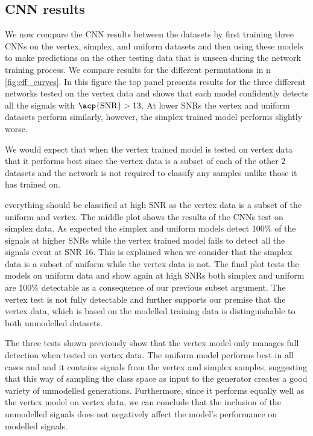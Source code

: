 \documentclass[12pt]{iopart}
\begin{document}
\subsection{CNN results}

We now compare the \ac{CNN} results between the datasets by first training three \acp{CNN} on the vertex, simplex, and uniform datasets and then using these models to make predictions on the other testing data that is unseen during the network training process. We compare results for the different permutations in n \cref{fig:eff_curves}. In this figure the top panel presents results for the three different networks tested on the vertex data and shows that each model confidently detects all the signals with $\text{\acp{SNR}} >13$. At lower \acp{SNR} the vertex and uniform datasets perform similarly, however, the simplex trained model performs slightly worse.

We would expect that when the vertex trained model is tested on vertex data that it performs best since the vertex data is a subset of each of the other 2 datasets and the network is not required to classify any samples unlike those it has trained on.

everything should be classified at high \ac{SNR} as the vertex data is a subset of the uniform and vertex. The middle plot shows the results of the \acp{CNN} test on simplex data.  As expected the simplex and uniform models detect 100\% of the signals at higher \acp{SNR} while the vertex trained model fails to detect all the signals event at \ac{SNR} 16. This is explained when we consider that the simplex data is a subset of uniform while the vertex data is not. The final plot tests the models on uniform data and show again at high \acp{SNR} both simplex and uniform are 100\% detectable as a consequence of our previous subset argument. The vertex test is not fully detectable and further supports our premise that the vertex data, which is based on the modelled training data is distinguishable to both unmodelled datasets. 

The three tests shown previously show that the vertex model only manages full detection when tested on vertex data. The uniform model performs best in all cases and and it contains signals from the vertex and simplex samples, suggesting that this way of sampling the class space as input to the generator creates a good variety of unmodelled generations. Furthermore, since it performs equally well as the vertex model on vertex data, we can conclude that the inclusion of the unmodelled signals does not negatively affect the model's performance on modelled signals.
\end{document}
